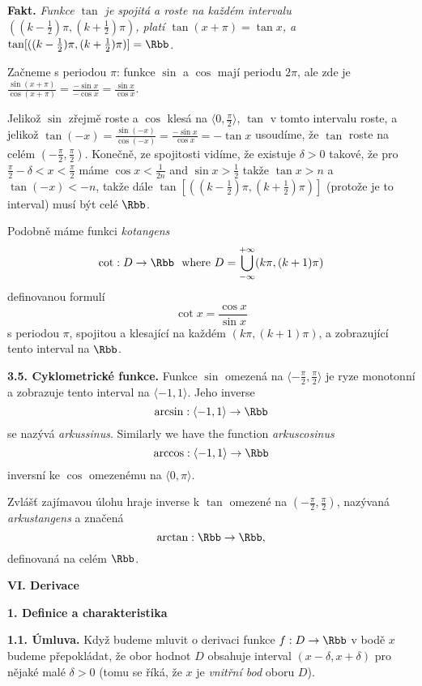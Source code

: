 \documentclass[12pt]{article}
\begin{document}
{ \smallskip
 
 {\bf Fakt.} {\em Funkce $\tan$ je spojitá a roste na každém intervalu $((k-\frac12)\pi,(k+\frac12)\pi)$, platí $\tan(x+\pi)=\tan x$, a 
 $\tan[((k-\frac12)\pi,(k+\frac12)\pi)]=\Rbb$.}

 Začneme s periodou $\pi$: funkce $\sin$ a $\cos$ mají periodu $2\pi$, ale zde je $\frac{\sin(x+\pi)}{\cos(x+\pi)}=
 \frac{-\sin x}{-\cos x}=\frac{\sin x}{\cos x}$.
 
Jelikož $\sin$ zřejmě roste a $\cos$ klesá na $\langle 0,\frac{\pi}{2}\rangle$, $\tan$ v tomto intervalu roste, a jelikož $\tan(-x)=
 \frac{\sin(-x)}{\cos(-x)}=\frac{-\sin x}{\cos x}=-\tan x$ usoudíme, že $\tan$ roste na celém $(-\frac{\pi}{2},\frac{\pi}{2})$. Konečně, ze spojitosti vidíme, že existuje $\delta>0$ takové, že pro $\frac{\pi}{2}-\delta<x<\frac{\pi}{2}$ máme
 $\cos x<\frac1{2n}$ and $\sin x>\frac12$ takže $\tan x> n$ a $\tan(-x)<-n$, takže dále
  $\tan[((k-\frac12)\pi,(k+\frac12)\pi)]$ (protože je to interval) musí být celé $\Rbb$.\sq
  
  \medskip
  
Podobně máme funkci {\em kotangens}
   $$
 \cot:D\to\Rbb\  \ \text{where}\ D=\bigcup_{-\infty}^{+\infty}(k\pi,(k+1)\pi)
 $$
 definovanou formulí
 $$
 \cot x=\frac{\cos x}{\sin x}
 $$
 s periodou $\pi$, spojitou a klesající na každém $(k\pi,(k+1)\pi)$, a zobrazující tento interval na $\Rbb$.
 
 \bigskip
 
 {\bf 3.5. Cyklometrické funkce.} Funkce $\sin$ omezená na $\langle-\frac{\pi}{2},\frac{\pi}{2}\rangle$ je ryze monotonní a zobrazuje tento interval na $\langle-1,1\rangle$. Jeho inverse 
 $$
 \arcsin:\langle-1,1\rangle \to\Rbb
 $$
se nazývá {\em arkussinus}. Similarly we have the function {\em arkuscosinus}
 $$
 \arccos:\langle-1,1\rangle \to\Rbb
 $$
 inversní ke $\cos$ omezenému na $\langle 0,\pi\rangle$.

 Zvlášť zajímavou úlohu hraje inverse k $\tan$ omezené na $(-\frac{\pi}{2},\frac{\pi}{2})$, nazývaná {\em arkustangens} a značená
 $$
 \arctan:\Rbb\to\Rbb,
 $$
 definovaná na celém $\Rbb$.
 
 \newpage

 
 \centerline{\Large\bf VI. Derivace} 
 
 \vskip10mm
 
 {\large\bf 1. Definice a charakteristika}
 
 \bigskip
 
 {\bf 1.1. Úmluva.} Když budeme mluvit o derivaci funkce
 $f:D\to\Rbb$ v bodě $x$ budeme přepokládat, že obor hodnot $D$ obsahuje interval $(x-\delta,x+\delta)$ pro nějaké malé $\delta>0$ (tomu se říká, že $x$ je  {\em vnitřní bod} oboru $D$).

}
\end{document}
